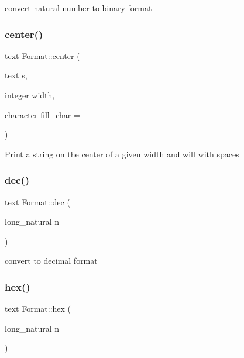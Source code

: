 convert natural number to binary format \mbox{\label{classez_1_1essential_1_1Format_aad619b944b2ab388ccb82b1d82ef610b}} 
\subsubsection{\texorpdfstring{center()}{center()}}
{\footnotesize\ttfamily text Format\+::center (\begin{DoxyParamCaption}\item[{text}]{s,  }\item[{integer}]{width,  }\item[{character}]{fill\+\_\+char = {\ttfamily \textquotesingle{}~\textquotesingle{}} }\end{DoxyParamCaption})\hspace{0.3cm}{\ttfamily [static]}}

Print a string on the center of a given width and will with spaces \mbox{\label{classez_1_1essential_1_1Format_ab163df0d05d66c0402c46ecfae2dee82}} 
\subsubsection{\texorpdfstring{dec()}{dec()}}
{\footnotesize\ttfamily text Format\+::dec (\begin{DoxyParamCaption}\item[{long\+\_\+natural}]{n }\end{DoxyParamCaption})\hspace{0.3cm}{\ttfamily [static]}}

convert to decimal format \mbox{\label{classez_1_1essential_1_1Format_aa61095f58c70d7a4dfcb1e555fd3673d}} 
\subsubsection{\texorpdfstring{hex()}{hex()}}
{\footnotesize\ttfamily text Format\+::hex (\begin{DoxyParamCaption}\item[{long\+\_\+natural}]{n }\end{DoxyParamCaption})\hspace{0.3cm}{\ttfamily [static]}}

